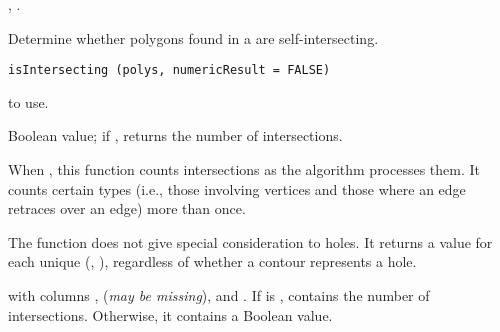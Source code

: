 \documentclass[letterpaper]{book}
\begin{document}
%
\begin{SeeAlso}\relax
{},
.
\end{SeeAlso}
%
\begin{Examples}
\end{Examples}
%
\begin{Description}\relax
Determine whether polygons found in a  are
self-intersecting.
\end{Description}
%
\begin{Usage}
\begin{verbatim}
isIntersecting (polys, numericResult = FALSE)
\end{verbatim}
\end{Usage}
%
\begin{Arguments}
\begin{ldescription}
\item[\code{polys}]  to use.
\item[\code{numericResult}] Boolean value; if , returns the number
of intersections.
\end{ldescription}
\end{Arguments}
%
\begin{Details}\relax
When , this function counts intersections
as the algorithm processes them.  It counts certain types (i.e., those
involving vertices and those where an edge retraces over an edge) more
than once.

The function does not give special consideration to holes.  It returns
a value for each unique (, ), regardless of
whether a contour represents a hole.
\end{Details}
%
\begin{Value}
 with columns ,  (\emph{may be missing}),
and .  If  is ,
 contains the number of intersections.  Otherwise,
it contains a Boolean value.
\end{Value}
\end{document}
